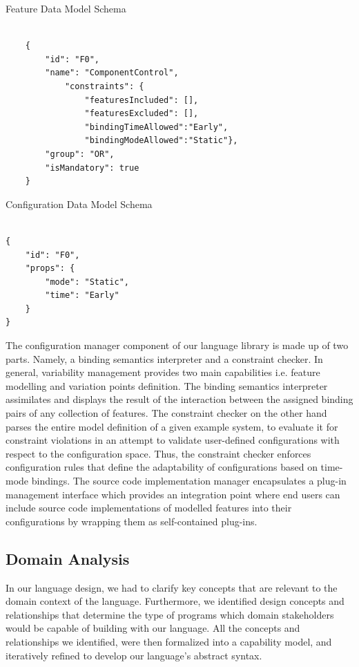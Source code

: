 \documentclass[conference]{IEEEtran}
\begin{document}
\begin{listing}[H]
\caption{Feature Data Model Schema}
\begin{verbatim}

    {
        "id": "F0",
        "name": "ComponentControl",
            "constraints": {
	            "featuresIncluded": [],
	            "featuresExcluded": [],
	            "bindingTimeAllowed":"Early",
	            "bindingModeAllowed":"Static"},
        "group": "OR",
        "isMandatory": true
    }

\end{verbatim}
\label{feat-schema}
\end{listing}

\begin{listing}[H]
\caption{Configuration Data Model Schema}
\begin{verbatim}

{
    "id": "F0",
    "props": {
        "mode": "Static",
        "time": "Early"
    }
}
\end{verbatim}
\label{bind-schema}
\end{listing}

The configuration manager component of our language library is made up of two parts. Namely, a binding semantics interpreter and a constraint checker. In general, variability management provides two main capabilities i.e. feature modelling and variation points definition. The binding semantics interpreter assimilates and displays the result of the interaction between the assigned binding pairs of any collection of features. The constraint checker on the other hand parses the entire model definition of a given example system, to evaluate it for constraint violations in an attempt to validate user-defined configurations with respect to the configuration space. Thus, the constraint checker enforces configuration rules that define the adaptability of configurations based on time-mode bindings.
The source code implementation manager encapsulates a plug-in management interface which provides an integration point where end users can include source code implementations of modelled features into their configurations by wrapping them as self-contained plug-ins.

\subsection{Domain Analysis}
In our language design, we had to clarify key concepts that are relevant to the domain context of the language. Furthermore, we identified design concepts and relationships that determine the type of programs which domain stakeholders would be capable of building with our language. All the concepts and relationships we identified, were then formalized into a capability model, and iteratively refined to develop our language's abstract syntax.
\end{document}
